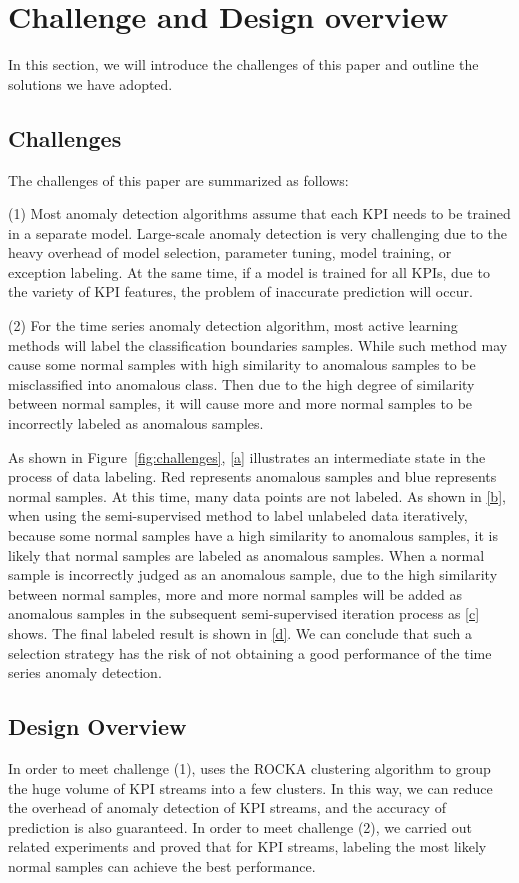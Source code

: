 \section{Challenge and Design overview}
\label{sec:challenge}

In this section, we will introduce the challenges of this paper and outline the solutions we have adopted.

\subsection{Challenges}
\label{subsubsec:challenges}
The challenges of this paper are summarized as follows:

(1) Most anomaly detection algorithms assume that each KPI needs to be trained in a separate model. Large-scale anomaly detection is very challenging due to the heavy overhead of model selection, parameter tuning, model training, or exception labeling. At the same time, if a model is trained for all KPIs, due to the variety of KPI features, the problem of inaccurate prediction will occur.

(2) For the time series anomaly detection algorithm, most active learning methods will label the classification boundaries samples. While such method may cause some normal samples with high similarity to anomalous samples to be misclassified into anomalous class. Then due to the high degree of similarity between normal samples, it will cause more and more normal samples to be incorrectly labeled as anomalous samples.


As shown in Figure~\ref{fig:challenges}, \autoref{a} illustrates an intermediate state in the process of data labeling. Red represents anomalous samples and blue represents normal samples. At this time, many data points are not labeled. As shown in \autoref{b}, when using the semi-supervised method to label unlabeled data iteratively, because some normal samples have a high similarity to anomalous samples, it is likely that normal samples are labeled as anomalous samples. When a normal sample is incorrectly judged as an anomalous sample, due to the high similarity between normal samples, more and more normal samples will be added as anomalous samples in the subsequent semi-supervised iteration process as \autoref{c} shows. The final labeled result is shown in \autoref{d}. We can conclude that such a selection strategy has the risk of not obtaining 
a good performance of the time series anomaly detection.

\subsection{Design Overview}
In order to meet challenge (1), \name{} uses the ROCKA\cite{lirobust} clustering algorithm to group the huge volume of KPI streams into a few clusters. In this way, we can reduce the overhead of anomaly detection of KPI streams, and the accuracy of prediction is also guaranteed. In order to meet challenge (2), we carried out related experiments and proved that for KPI streams, labeling the most likely normal samples can achieve the best performance.


